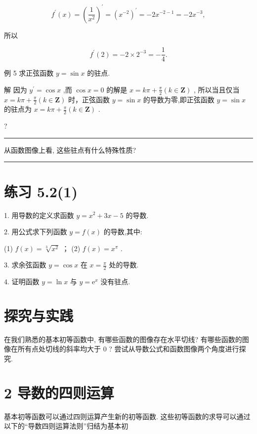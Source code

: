 \documentclass[10pt]{article}
\newcommand{\HRule}{\begin{center}\rule{0.9\linewidth}{0.2mm}\end{center}}
\begin{document}
\[
{f}^{\prime }\left( x\right)  = {\left( \frac{1}{{x}^{2}}\right) }^{\prime } = {\left( {x}^{-2}\right) }^{\prime } =  - 2{x}^{-2 - 1} =  - 2{x}^{-3},
\]

所以

\[
{f}^{\prime }\left( 2\right)  =  - 2 \times  {2}^{-3} =  - \frac{1}{4}.
\]

例 5 求正弦函数 \(y = \sin x\) 的驻点.

解 因为 \({y}^{\prime } = \cos x\) ,而 \(\cos x = 0\) 的解是 \(x = {k\pi } + \frac{\pi }{2}\left( {k \in  \mathbf{Z}}\right)\) , 所以当且仅当 \(x = {k\pi } + \frac{\pi }{2}\left( {k \in  \mathbf{Z}}\right)\) 时，正弦函数 \(y = \sin x\) 的导数为零,即正弦函数 \(y = \sin x\) 的驻点为 \(x = {k\pi } + \frac{\pi }{2}\left( {k \in  \mathbf{Z}}\right)\) .

?

\HRule

从函数图像上看, 这些驻点有什么特殊性质?

\HRule

\section*{练习 5.2(1)}

1. 用导数的定义求函数 \(y = {x}^{2} + {3x} - 5\) 的导数.

2. 用公式求下列函数 \(y = f\left( x\right)\) 的导数,其中:

(1) \(f\left( x\right)  = \sqrt[3]{{x}^{2}}\) ； (2) \(f\left( x\right)  = {x}^{\pi }\) .

3. 求余弦函数 \(y = \cos x\) 在 \(x = \frac{\pi }{2}\) 处的导数.

4. 证明函数 \(y = \ln x\) 与 \(y = {\mathrm{e}}^{x}\) 没有驻点.

\section*{探究与实践}

在我们熟悉的基本初等函数中, 有哪些函数的图像存在水平切线? 有哪些函数的图像在所有点处切线的斜率均大于 0 ? 尝试从导数公式和函数图像两个角度进行探究.

\section*{2 导数的四则运算}

基本初等函数可以通过四则运算产生新的初等函数. 这些初等函数的求导可以通过以下的“导数四则运算法则”归结为基本初
\end{document}
